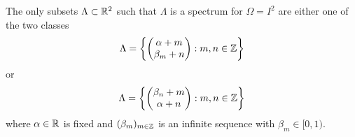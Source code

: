\documentclass[../thesis.tex]{subfiles}
\begin{document}
\begin{theorem}\label{thrm:class_all_shift_2d}
    The only subsets $\Lambda \subset \mathbb{R}^2$ such that $\Lambda$ is a spectrum for $\Omega = I^2$ are either one of the two classes
    \begin{equation}\label{eq:2d_all_shift_class_1}
        \Lambda = \left\{
            \begin{pmatrix}
            \alpha + m\\
            \beta_m + n
            \end{pmatrix} : m,n \in  \mathbb{Z}
            \right\}
    \end{equation}
    or
    \begin{equation}\label{eq:2d_all_shift_class_2}
        \Lambda = \left\{
            \begin{pmatrix}
            \beta_n + m\\
            \alpha + n
            \end{pmatrix} : m,n \in  \mathbb{Z}
            \right\}
    \end{equation}
    where $\alpha \in \mathbb{R}$ is fixed and $(\beta_m)_{m\in \mathbb{Z}}$ is an infinite sequence with $\beta_m \in [0,1)$.
\end{theorem}
\end{document}
